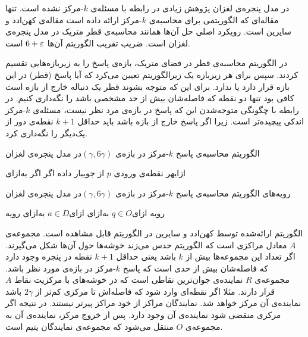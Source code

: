 در مدل پنجره‌ی لغزان پژوهش زیادی در رابطه با مسئله‌ی $k$-مرکز نشده است. تنها مقاله‌ای که الگوریتمی برای محاسبه‌ی $k$-مرکز ارائه داده است مقاله‌ی کهن‌ادد و سایرین  است. رویکرد اصلی حل آن‌ها همانند محاسبه‌ی قطر متریک در مدل پنجره‌ی لغزان است. ضریب تقریب الگوریتم آن‌ها $6+\varepsilon$ است.

در الگوریتم محاسبه‌ی قطر در فضای متریک، بازه‌ی پاسخ را به زیربازه‌هایی تقسیم کردند. سپس برای هر زیربازه یک زیرالگوریتم تعیین می‌کرد که آیا پاسخ (قطر) در این بازه قرار دارد یا ندارد. برای این که متوجه بشوند قطر یک دنباله خارج از بازه است کافی بود تنها دو نقطه که فاصله‌‌شان بیش از حد مشخصی باشد را نگه‌داری کنیم. در رابطه با چگونگی متوجه‌شدن این که پاسخ در بازه‌ی مرد نظر نیست، مسئله‌ی $k$-مرکز اندکی پیچیده‌تر است. زیرا اگر پاسخ خارج از بازه باشد باید حداقل $k+1$ نقطه‌ی دور از یک‌دیگر را نگه‌داری کرد. 

\caption
{الگوریتم محاسبه‌ی پاسخ $k$-مرکز در بازه‌ی $(\gamma, 6 \gamma) $در مدل پنجره‌ی لغزان }
‌ازای{هر نقطه‌ی ورودی $p$ از جویبار داده}
‌اگر{}
‌اگر{}
‌به‌ازای{}

\caption
{رویه‌های الگوریتم محاسبه‌ی پاسخ $k$-مرکز در بازه‌ی $(\gamma, 6 \gamma) $در مدل پنجره‌ی لغزان}

‌رویه{}
\EndIf{}
‌ازای{$q \in O$}
\EndIf{}
‌به‌ازای{}
\EndIf{}
\Else{}
‌ازای{$a \in D$}
‌به‌ازای{}
\EndIf{}
‌رویه{}



الگوریتم ارائه‌شده توسط کهن‌ادد و سایرین در الگوریتم  قابل مشاهده است. مجموعه‌ی $A$ معادل مراکزی است که الگوریتم حدس می‌زند خوشه‌ها حول آن‌ها شکل می‌گیرند. اگر تعداد این مجموعه‌ها بیش از $k$ باشد یعنی حداقل $k+1$ نقطه در پنجره وجود دارد که فاصله‌شان بیش از حدی است که پاسخ $k$-مرکز در بازه‌ی مورد نظر باشد. مجموعه‌ی $R$ نماینده‌ی جوان‌ترین نقاطی است که در خوشه‌های با مرکزیت نقاط $A$ قرار دارند. مثلا اگر نقطه‌ای وارد شود که فاصله‌اش تا مرکزی کم‌تر از $2 \gamma$ باشد نماینده‌ی آن مرکز خواهد شد. نمایندگان مراکز از خود مراکز پیرتر نیستند. در نتیجه اگر مرکزی منقضی شود نماینده‌ی آن وجود دارد. پس از خروج مرکز، نماینده‌ی آن به مجموعه‌ی $O$ منتقل می‌شود که مجموعه‌ی نمایندگان یتیم  است.
 
